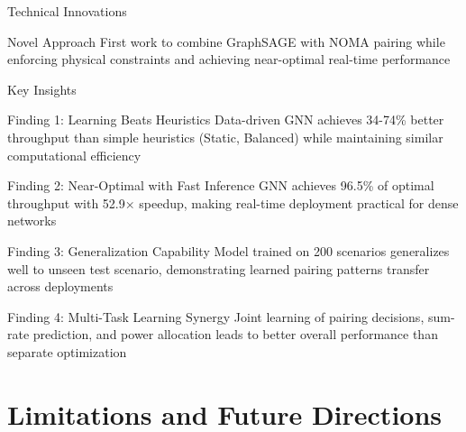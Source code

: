 \documentclass[aspectratio=169]{beamer}
\begin{document}
\begin{frame}{Technical Innovations}
    \vspace{0.3cm}
    
    \begin{exampleblock}{Novel Approach}
        First work to combine GraphSAGE with NOMA pairing while enforcing physical constraints and achieving near-optimal real-time performance
    \end{exampleblock}
\end{frame}

\begin{frame}{Key Insights}
    \begin{block}{Finding 1: Learning Beats Heuristics}
        Data-driven GNN achieves 34-74\% better throughput than simple heuristics (Static, Balanced) while maintaining similar computational efficiency
    \end{block}
    
    \begin{block}{Finding 2: Near-Optimal with Fast Inference}
        GNN achieves 96.5\% of optimal throughput with 52.9× speedup, making real-time deployment practical for dense networks
    \end{block}
    
    \begin{block}{Finding 3: Generalization Capability}
        Model trained on 200 scenarios generalizes well to unseen test scenario, demonstrating learned pairing patterns transfer across deployments
    \end{block}
    
    \begin{block}{Finding 4: Multi-Task Learning Synergy}
        Joint learning of pairing decisions, sum-rate prediction, and power allocation leads to better overall performance than separate optimization
    \end{block}
\end{frame}

\section{Limitations and Future Directions}
\end{document}
